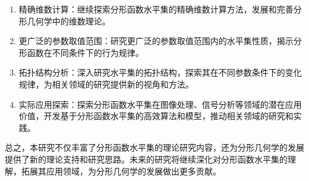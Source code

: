 \begin{enumerate}
      \item 精确维数计算：继续探索分形函数水平集的精确维数计算方法，发展和完善分形几何学中的维数理论。
      \item 更广泛的参数取值范围：研究更广泛的参数取值范围内的水平集性质，揭示分形函数在不同条件下的行为规律。
      \item 拓扑结构分析：深入研究水平集的拓扑结构，探索其在不同参数条件下的变化规律，为相关领域的研究提供新的视角和方法。
      \item 实际应用探索：探索分形函数水平集在图像处理、信号分析等领域的潜在应用价值，开发基于分形函数水平集的高效算法和模型，推动相关领域的研究和实践。
\end{enumerate}





总之，本研究不仅丰富了分形函数水平集的理论研究内容，还为分形几何学的发展提供了新的理论支持和研究思路。未来的研究将继续深化对分形函数水平集的理解，拓展其应用领域，为分形几何学的发展做出更多贡献。


\nocite{1}
\nocite{2}
\nocite{3}
\nocite{4}
\nocite{5}
\nocite{6}
\nocite{7}
\nocite{8}
\nocite{9}
\nocite{10}
